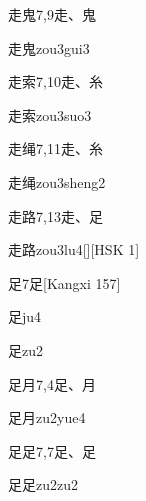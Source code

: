 \begin{entry}{走鬼}{7,9}{⾛、⿁}
  \begin{phonetics}{走鬼}{zou3gui3}
  \end{phonetics}
\end{entry}

\begin{entry}{走索}{7,10}{⾛、⽷}
  \begin{phonetics}{走索}{zou3suo3}
  \end{phonetics}
\end{entry}

\begin{entry}{走绳}{7,11}{⾛、⽷}
  \begin{phonetics}{走绳}{zou3sheng2}
  \end{phonetics}
\end{entry}

\begin{entry}{走路}{7,13}{⾛、⾜}
  \begin{phonetics}{走路}{zou3lu4}[][HSK 1]
  \end{phonetics}
\end{entry}

\begin{entry}{足}{7}{⾜}[Kangxi 157]
  \begin{phonetics}{足}{ju4}
  \end{phonetics}
  \begin{phonetics}{足}{zu2}
  \end{phonetics}
\end{entry}

\begin{entry}{足月}{7,4}{⾜、⽉}
  \begin{phonetics}{足月}{zu2yue4}
  \end{phonetics}
\end{entry}

\begin{entry}{足足}{7,7}{⾜、⾜}
  \begin{phonetics}{足足}{zu2zu2}
  \end{phonetics}
\end{entry}

